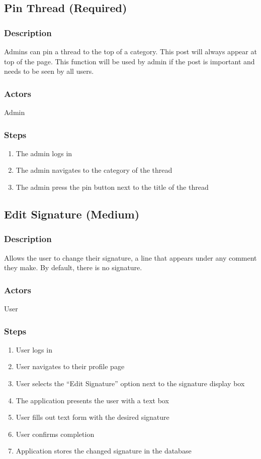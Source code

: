 \documentclass[12pt]{scrartcl}
\begin{document}
\subsection{Pin Thread (Required)}
\subsubsection{Description}
Admins can pin a thread to the top of a category. This post will always appear at top of the page.
This function will be used by admin if the post is important and needs to be seen by all users.

\subsubsection{Actors}

Admin

\subsubsection{Steps}

\begin{enumerate}
\item The admin logs in
\item The admin navigates to the category of the thread
\item The admin press the pin button next to the title of the thread
\end{enumerate}

\subsection{Edit Signature (Medium)}
\subsubsection{Description}
Allows the user to change their signature, a line that appears under any comment they make. By default, there is no signature.

\subsubsection{Actors}
User

\subsubsection{Steps}
\begin {enumerate}
\item User logs in
\item User navigates to their profile page
\item User selects the “Edit Signature” option next to the signature display box
\item The application presents the user with a text box
\item User fills out text form with the desired signature
\item User confirms completion
\item Application stores the changed signature in the database
\end {enumerate}
\end{document}
